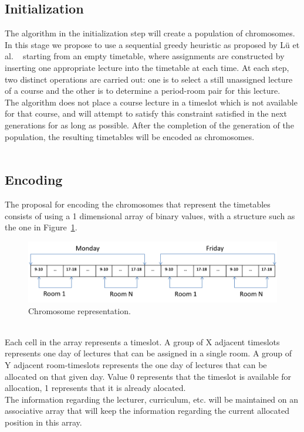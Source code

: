 \subsection{Initialization}
\label{subsubsubsec:ga-initialization}
The algorithm in the initialization step will create a population of chromosomes. In this stage we propose to use a sequential greedy heuristic as proposed by Lü et al. ~\cite{Lue2010} starting from an empty timetable, where assignments are constructed by inserting one appropriate lecture into the timetable at each time. At each step, two distinct operations are carried out: one is to select a still unassigned lecture of a course and the other is to determine a period-room pair for this lecture.\\
The algorithm does not place a course lecture in a timeslot which is not available for that course, and will attempt to satisfy this constraint satisfied in the next generations for as long as possible.  After the completion of the generation of the population, the resulting timetables will be encoded as chromosomes.\\
\\
\subsection{Encoding}
\label{subsubsubsec:ga-encoding}
The proposal for encoding the chromosomes that represent the timetables consists of using a 1 dimensional array of binary values, with a structure such as the one in Figure~\ref{fig:chromosomeRepresentation}.\\ 
\begin{figure}[h!]
 \centering
   \includegraphics[width=15cm]{./images/figures/Fig3_ChromosomeRepresentation_GA.png}
   \caption{Chromosome representation.}
   \label{fig:chromosomeRepresentation}
\end{figure}\\
Each cell in the array represents a timeslot. A group of X adjacent timeslots represents one day of lectures that can be assigned in a single room. A group of Y adjacent room-timeslots represents the one day of lectures that can be allocated on that given day. Value 0 represents that the timeslot is available for allocation, 1 represents that it is already alocated.\\
The information regarding the lecturer, curriculum, etc. will be maintained on an associative array that will keep the information regarding the current allocated position in this array.\\
